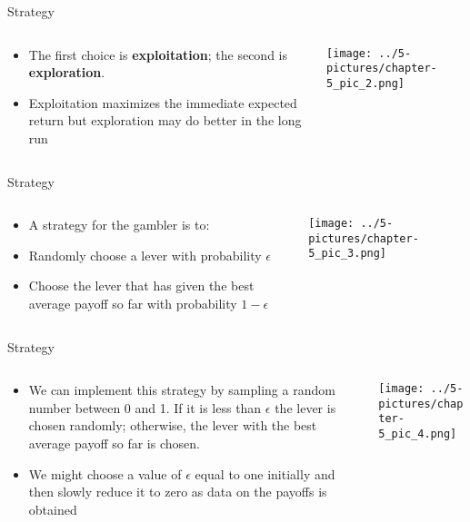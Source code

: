 \documentclass[11pt]{beamer}
\begin{document}
\begin{frame}{Strategy}
\begin{columns}[T] %
\begin{column}{.48\textwidth}
        \begin{itemize}
		\item The first choice is \textbf{exploitation}; the second is \textbf{exploration}.
		\item Exploitation maximizes the immediate expected return but exploration may do better in the long run
        \end{itemize}
\end{column}%
\hfill%
\begin{column}{.48\textwidth}
        \texttt{[image: ../5-pictures/chapter-5\_pic\_2.png]}
\end{column}%
\end{columns}
\end{frame}
\begin{frame}{Strategy}
\begin{columns}[T] %
\begin{column}{.48\textwidth}
        \begin{itemize}
		\item A strategy for the gambler is to:
		\item Randomly choose a lever with probability $\epsilon$
		\item Choose the lever that has given the best average payoff so far with probability $1-\epsilon$
        \end{itemize}
\end{column}%
\hfill%
\begin{column}{.48\textwidth}
        \texttt{[image: ../5-pictures/chapter-5\_pic\_3.png]}
\end{column}%
\end{columns}
\end{frame}
\begin{frame}{Strategy}
\begin{columns}[T] %
\begin{column}{.48\textwidth}
        \begin{itemize}
		\item We can implement this strategy by sampling a random number between 0 and 1. If it is less than $\epsilon$ the lever is chosen randomly; otherwise, the lever with the best average payoff so far is chosen. 
		\item We might choose a value of $\epsilon$ equal to one initially and then slowly reduce it to zero as data on the payoffs is obtained
        \end{itemize}
\end{column}%
\hfill%
\begin{column}{.48\textwidth}
        \texttt{[image: ../5-pictures/chapter-5\_pic\_4.png]}
\end{column}%
\end{columns}
\end{frame}
\end{document}
